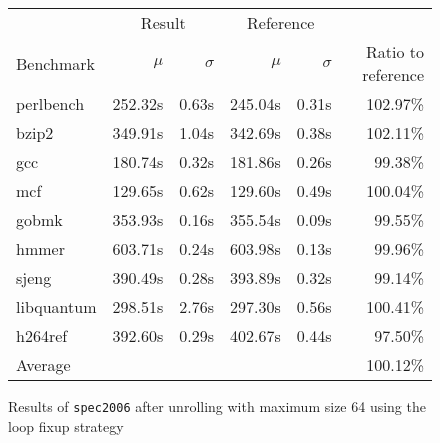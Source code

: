 \begin{figure}[h]
    \begin{center}
        \begin{tabular}{lrrrrr}
            \toprule
            & \multicolumn{2}{c}{Result} & \multicolumn{2}{c}{Reference}\\
            Benchmark & $\mu$ & $\sigma$ & $\mu$ & $\sigma$ & Ratio to reference\\
            \midrule
            perlbench & 252.32s & 0.63s & 245.04s & 0.31s & 102.97\%\\
            bzip2 & 349.91s & 1.04s & 342.69s & 0.38s & 102.11\%\\
            gcc & 180.74s & 0.32s & 181.86s & 0.26s & 99.38\%\\
            mcf & 129.65s & 0.62s & 129.60s & 0.49s & 100.04\%\\
            gobmk & 353.93s & 0.16s & 355.54s & 0.09s & 99.55\%\\
            hmmer & 603.71s & 0.24s & 603.98s & 0.13s & 99.96\%\\
            sjeng & 390.49s & 0.28s & 393.89s & 0.32s & 99.14\%\\
            libquantum & 298.51s & 2.76s & 297.30s & 0.56s & 100.41\%\\
            h264ref & 392.60s & 0.29s & 402.67s & 0.44s & 97.50\%\\
            \midrule
            Average & & & & & 100.12\%\\
            \bottomrule
        \end{tabular}
    \end{center}
    \caption{Results of \texttt{spec2006} after unrolling with maximum size 64 using the loop fixup strategy}
    \label{fig:eval:perf:loop:64}
\end{figure}
